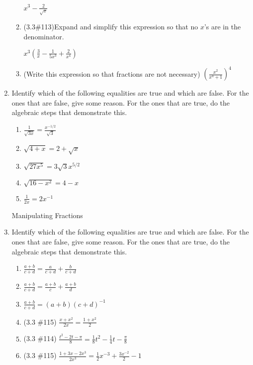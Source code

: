 \documentclass[11pt,fleqn]{article}
\begin{document}
\begin{enumerate}
\begin{enumerate}
	$x^3-\frac{2}{\sqrt{x}}$\\ \vfill
	\item (3.3\#113)Expand and simplify this expression so that no $x$'s are in the denominator.\\ \vfill 
	
	$x^3\left(\frac{3}{x}-\frac{1}{5x^3}+\frac{2}{x^4}\right)$\\ \vfill
	
	\item (Write this expression so that fractions are not necessary) $(\frac{x^2}{x^4+1})^4$\\ \vfill
	\end{enumerate}
\newpage
\item Identify which of the following equalities are true and which are false. For the ones that are false, give some reason. For the ones that are true, do the algebraic steps that demonstrate this.
	\begin{enumerate}
	\item $\frac{1}{\sqrt{3x}}=\frac{x^{-1/2}}{\sqrt{3}}$\\ \vfill
	\item $\sqrt{4+x}=2+\sqrt{x}$\\ \vfill
	\item $\sqrt{27x^5}=3\sqrt{3}x^{5/2}$\\ \vfill
	\item $\sqrt{16-x^2}=4-x$ \\ \vfill
	\item $\frac{1}{2x}=2x^{-1}$\\ \vfill
	\end{enumerate}
	
Manipulating Fractions
\item Identify which of the following equalities are true and which are false. For the ones that are false, give some reason. For the ones that are true, do the algebraic steps that demonstrate this.

	\begin{enumerate}
	\item $\frac{a+b}{c+d}=\frac{a}{c+d}+\frac{b}{c+d}$\\ \vfill
	\item $\frac{a+b}{c+d}=\frac{a+b}{c}+\frac{a+b}{d}$\\ \vfill
	\item $\frac{a+b}{c+d}=(a+b)(c+d)^{-1}$\\ \vfill
	\item (3.3 \#115) $\frac{x+x^2}{2x}=\frac{1+x^2}{2}$ \\ \vfill
	\item (3.3 \#114) $\frac{t^2-2t-\pi}{8}=\frac{1}{8}t^2-\frac{1}{4}t-\frac{\pi}{8}$ \\ \vfill
	\item (3.3 \#115) $\frac{1+3x-2x^3}{2x^3}=\frac{1}{2}x^{-3}+\frac{3x^{-2}}{2}-1$ \\ \vfill


\end{enumerate}
\end{enumerate}
\end{document}
